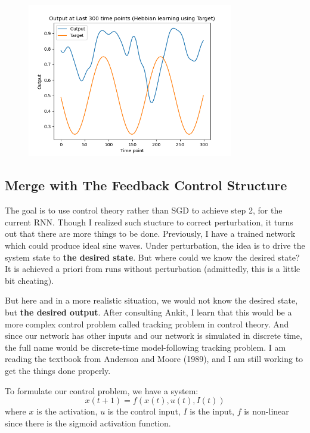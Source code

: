 \documentclass[12pt, a4paper]{article}
\begin{document}
\begin{figure}[H]
    \centering
    \includegraphics[width=0.8\textwidth]{RNN/FORCE/fig/FORCE_wavebasis_outputhcp.png} \\
\end{figure}


\newpage

\subsection*{Merge with The Feedback Control Structure}

The goal is to use control theory rather than SGD to achieve step 2, for the current RNN. Though I realized such stucture to correct perturbation, it turns out that there are more things to be done. Previously, I have a trained network which could produce ideal sine waves. Under perturbation, the idea is to drive the system state to \textbf{the desired state}. But where could we know the desired state? It is achieved a priori from runs without perturbation (admittedly, this is a little bit cheating). 

But here and in a more realistic situation, we would not know the desired state, but \textbf{the desired output}. After consulting Ankit, I learn that this would be a more complex control problem called tracking problem in control theory. And since our network has other inputs and our network is simulated in discrete time, the full name would be discrete-time model-following tracking problem. I am reading the textbook from Anderson and Moore (1989), and I am still working to get the things done properly. 

To formulate our control problem, we have a system: 
$$x(t+1) = f(x(t), u(t), I(t))$$
where $x$ is the activation, $u$ is the control input, $I$ is the input, $f$ is non-linear since there is the sigmoid activation function.
\end{document}
